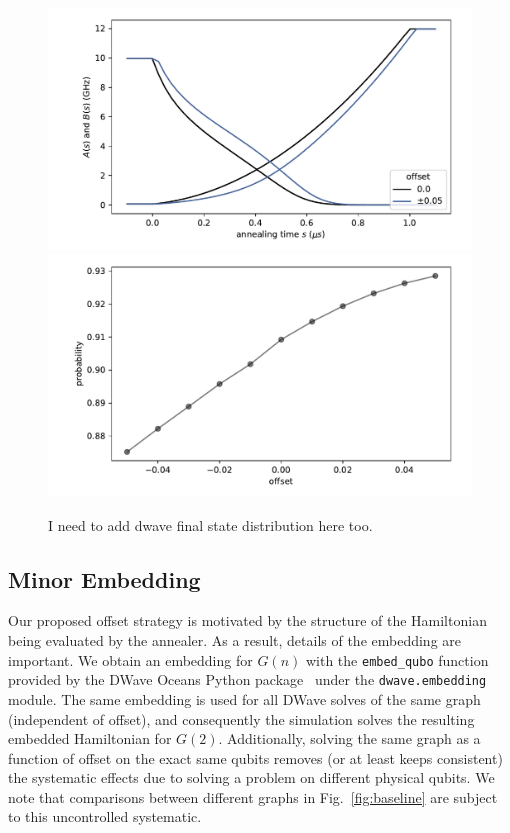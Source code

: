 \documentclass[prd,twocolumn,tightenlines,preprintnumbers,showpacs,superscriptaddress,notitlepage,nofootinbib,eqsecnum,
floatfix,longbibliography,aps,10pt]{revtex4-2}
\begin{document}
\begin{figure}
	\centering
	\includegraphics[width=\columnwidth]{./new_figures/anneal_schedule_extended.pdf}
	\includegraphics[width=\columnwidth]{./new_figures/NN2_offset_scaling_extended.pdf}
	\caption{{\color{red}I need to add dwave final state distribution here too.}}
	\label{fig:anneal_schedule_ext}
\end{figure}

\subsection{Minor Embedding}
\label{sec:methods:minor_embedding}
Our proposed offset strategy is motivated by the structure of the Hamiltonian being evaluated by the annealer. As a result, details of the embedding are important. We obtain an embedding for $G(n)$ with the \texttt{embed\_qubo} function provided by the DWave Oceans Python package~\cite{dwave_oceans} under the \texttt{dwave.embedding} module. The same embedding is used for all DWave solves of the same graph (independent of offset), and consequently the simulation solves the resulting embedded Hamiltonian for $G(2)$. Additionally, solving the same graph as a function of offset on the exact same qubits removes (or at least keeps consistent) the systematic effects due to solving a problem on different physical qubits. We note that comparisons between different graphs in Fig.~\ref{fig:baseline} are subject to this uncontrolled systematic.
\end{document}

